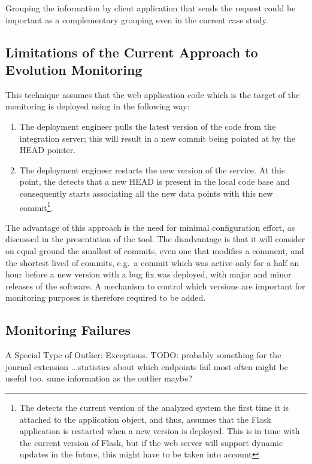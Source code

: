     Grouping the information by client application that sends the request could be important as a complementary grouping even in the current \zee case study. 

  \subsection*{Limitations of the Current Approach to Evolution Monitoring}

    This technique assumes that the web application code which is the target of the monitoring is deployed using \git in the following way: 

    \begin{enumerate}
      \item The deployment engineer pulls the latest version of the code from the integration server; this will result in a new commit being pointed at by the HEAD pointer. %
      \item The deployment engineer restarts the new version of the service. At this point, the \tool detects that a new HEAD is present in the local code base and consequently starts associating all the new data points with this new commit\footnote{The \tool detects the current version of the analyzed system the first time it is attached to the application object, and thus, assumes that the Flask application is restarted when a new version is deployed. This is in tune with the current version of Flask, but if the web server will support dynamic updates in the future, this might have to be taken into account}.
    \end{enumerate}

      The advantage of this approach is the need for minimal configuration effort, as discussed in the presentation of the tool. The disadvantage is that it will consider on equal ground the smallest of commits, even one that modifies a comment, and the shortest lived of commits, e.g.~a commit which was active only for a half an hour before a new version with a bug fix was deployed, with major and minor releases of the software. %
    A mechanism to control which versions are important for monitoring purposes is therefore required to be added.


  \subsection*{Monitoring Failures} 

    A Special Type of Outlier: Exceptions. TODO: probably something for the journal extension ...statistics about which endpoints fail most often might be useful too.
    same information as the outlier maybe?

